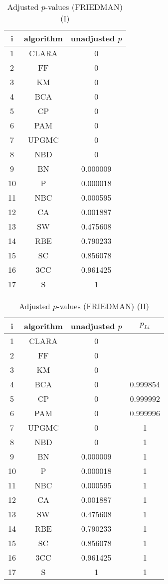 \documentclass[a4paper,10pt]{article}
\begin{document}
\begin{landscape}
\begin{table}[!htp]
\centering\small
\begin{tabular}{ccc}
i&algorithm&unadjusted $p$\\
\hline1&CLARA&0\\2&FF&0\\3&KM&0\\4&BCA&0\\5&CP&0\\6&PAM&0\\7&UPGMC&0\\8&NBD&0\\9&BN&0.000009\\10&P&0.000018\\11&NBC&0.000595\\12&CA&0.001887\\13&SW&0.475608\\14&RBE&0.790233\\15&SC&0.856078\\16&3CC&0.961425\\17&S&1\\\hline
\end{tabular}
\caption{Adjusted $p$-values (FRIEDMAN) (I)}
\end{table}
\begin{table}[!htp]
\centering\small
\begin{tabular}{cccc}
i&algorithm&unadjusted $p$&$p_{Li}$\\
\hline1&CLARA&0&\\2&FF&0&\\3&KM&0&\\4&BCA&0&0.999854\\5&CP&0&0.999992\\6&PAM&0&0.999996\\7&UPGMC&0&1\\8&NBD&0&1\\9&BN&0.000009&1\\10&P&0.000018&1\\11&NBC&0.000595&1\\12&CA&0.001887&1\\13&SW&0.475608&1\\14&RBE&0.790233&1\\15&SC&0.856078&1\\16&3CC&0.961425&1\\17&S&1&1\\\hline
\end{tabular}
\caption{Adjusted $p$-values (FRIEDMAN) (II)}
\end{table}

\newpage
\end{landscape}
\end{document}
